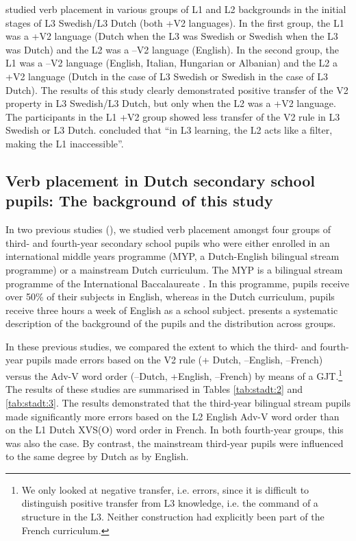 \documentclass[output=paper]{langsci/langscibook}
\begin{document}
\citet{BardelFalk2007} studied verb placement in various groups of L1 and L2 backgrounds in the initial stages of L3 Swedish/L3 Dutch (both +V2 languages). In the first group, the L1 was a +V2 language (Dutch when the L3 was Swedish or Swedish when the L3 was Dutch) and the L2 was a –V2 language (English). In the second group, the L1 was a –V2 language (English, Italian, Hungarian or Albanian) and the L2 a +V2 language (Dutch in the case of L3 Swedish or Swedish in the case of L3 Dutch). The results of this study clearly demonstrated positive transfer of the V2 property in L3 Swedish/L3 Dutch, but only when the L2 was a +V2 language. The participants in the L1 +V2 group showed less transfer of the V2 rule in L3 Swedish or L3 Dutch. \citet[480]{BardelFalk2007} concluded that “in L3 learning, the L2 acts like a filter, making the L1 inaccessible”.

\subsection{{Verb placement in Dutch secondary school pupils: The background of this study}}%
\label{sec:stadt:2.3}\largerpage

In two previous studies (\citealt{StadtEtAl2016, StadtEtAl2018Exposure}), we studied verb placement amongst four groups of third- and fourth-year secondary school pupils who were either enrolled in an international middle years programme (MYP, a Dutch-English bilingual stream programme) or a mainstream Dutch curriculum. The MYP is a bilingual stream programme of the International Baccalaureate \citep{IBO2019}. In this programme, pupils receive over 50\% of their subjects in English, whereas in the Dutch curriculum, pupils receive three hours a week of English as a school subject.  presents a systematic description of the background of the pupils and the distribution across groups.\largerpage[-2]

In these previous studies, we compared the extent to which the third- and fourth-year pupils made errors based on the V2 rule (+ Dutch, –English, –French) versus the Adv-V word order (–Dutch, +English, –French) by means of a GJT.\footnote{We only looked at negative transfer, i.e. errors, since it is difficult to distinguish positive transfer from L3 knowledge, i.e. the command of a structure in the L3. Neither construction had explicitly been part of the French curriculum.} The results of these studies are summarised in Tables \ref{tab:stadt:2} and \ref{tab:stadt:3}. The results demonstrated that the third-year bilingual stream pupils made significantly more errors based on the L2 English Adv-V word order than on the L1 Dutch XVS(O) word order in French. In both fourth-year groups, this was also the case. By contrast, the mainstream third-year pupils were influenced to the same degree by Dutch as by English.
\end{document}
